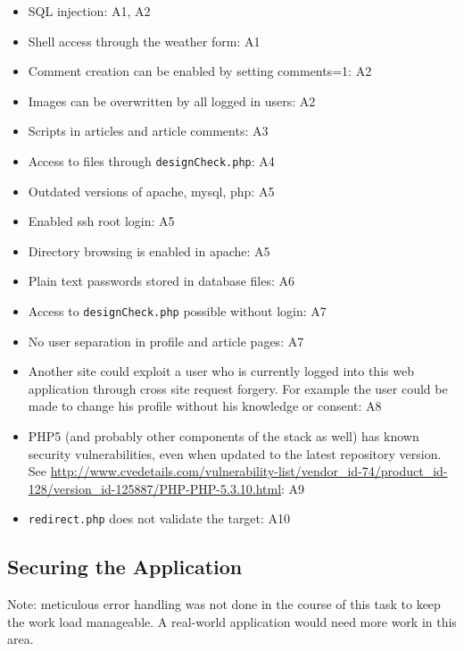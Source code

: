\documentclass[a4paper,10pt]{article}
\begin{document}
\begin{itemize}
\item SQL injection: A1, A2
\item Shell access through the weather form: A1
\item Comment creation can be enabled by setting comments=1: A2
\item Images can be overwritten by all logged in users: A2
\item Scripts in articles and article comments: A3
\item Access to files through \verb|designCheck.php|: A4
\item Outdated versions of apache, mysql, php: A5
\item Enabled ssh root login: A5
\item Directory browsing is enabled in apache: A5
\item Plain text passwords stored in database files: A6
\item Access to \verb|designCheck.php| possible without login: A7
\item No user separation in profile and article pages: A7
\item Another site could exploit a user who is currently logged into this web application
      through cross site request forgery. For example the user could be made to
      change his profile without his knowledge or consent: A8
\item PHP5 (and probably other components of the stack as well) has known security vulnerabilities,
      even when updated to the latest repository version. See \url{http://www.cvedetails.com/vulnerability-list/vendor_id-74/product_id-128/version_id-125887/PHP-PHP-5.3.10.html}: A9
\item \verb|redirect.php| does not validate the target: A10
\end{itemize}

\subsection{Securing the Application}

Note: meticulous error handling was not done in the course of this task to keep the work load
manageable. A real-world application would need more work in this area.
\end{document}
